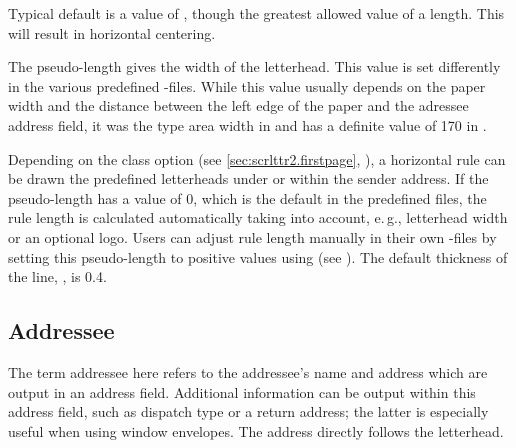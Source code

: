 Typical default is a value of
, though the greatest allowed value of
a length. This will result in horizontal centering.%
%
\EndIndexGroup


\begin{Declaration}
\end{Declaration}
The pseudo-length  gives the width of the
letterhead. This value is set differently in the various predefined
-files.
While this value usually depends on the paper width and the distance between
the left edge of the paper and the adressee address field, it was the type
area width in  and has a definite value of 170 in
.%
%
\EndIndexGroup


\begin{Declaration}
\end{Declaration}
Depending on the class option  (see
\autoref{sec:scrlttr2.firstpage},
), a horizontal rule can be drawn
the predefined letterheads under or within the sender
address. If the pseudo-length  has
a value of 0, which is the default in the predefined 
files, the rule length is calculated automatically taking into account,
e.\,g., letterhead width or an optional logo. Users can adjust rule length
manually in their own -files by setting this pseudo-length to
positive values using \Macro{\@setplength} (see
). The default thickness of
the line, , is
0.4.%
%
\EndIndexGroup
%
\EndIndexGroup


\subsection{Addressee}
%
\BeginIndexGroup
{}

The term addressee here refers to the addressee's name and address which
are output in an address field. Additional information can be output
within this address field, such as dispatch type or a return address;
the latter is especially useful when using window envelopes. The
address directly follows the letterhead.

